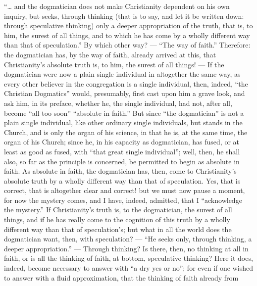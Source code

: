 \documentclass[12pt]{book}
\begin{document}
``\ldots{} and the dogmatician does not make Christianity dependent on his own inquiry, but seeks, through thinking (that is to say, and let it be written down: through speculative thinking) only a deeper appropriation of the truth, that is, to him, the surest of all things, and to which he has come by a wholly different way than that of speculation.'' By which other way? --- ``The way of faith.'' Therefore: the dogmatician has, by the way of faith, already arrived at this, that Christianity's absolute truth is, to him, the surest of all things! --- If the dogmatician were now a plain single individual
in altogether the same way, as every other believer in the congregation is a single individual, then, indeed, ``the Christian Dogmatics'' would, presumably, first cast upon him a grave look, and ask him, in its preface, whether he, the single individual, had not, after all, become ``all too soon'' ``absolute in faith.'' But since ``the dogmatician'' is not a plain single individual, like other ordinary single individuals, but stands in the Church, and is only the organ of his science, in that he is, at the same time, the organ of his Church; since he, in his capacity as dogmatician, has fused, or at least as good as fused, with ``that great single individual''; well, then, he shall also, so far as the principle is concerned, be permitted to begin as absolute in faith. As absolute in faith, the dogmatician has, then, come to Christianity's absolute truth by a wholly different way than that of speculation. Yes, that is correct, that is altogether clear and correct! but we must now pause a moment, for now the mystery comes, and I have, indeed, admitted, that I ``acknowledge the mystery.'' If Christianity's truth is, to the dogmatician, the surest of all things, and if he has really come to the cognition of this truth by a wholly different way than that of speculation's; but what in all the world does the dogmatician want, then, with speculation? --- ``He seeks only, through thinking, a deeper appropriation.'' --- Through thinking? Is there, then, no thinking at all in faith, or is all the thinking of faith, at bottom, speculative thinking? Here it does, indeed, become necessary to answer with ``a dry yes or no''; for even if one wished to answer with a fluid approximation, that the thinking of faith already from
\end{document}
